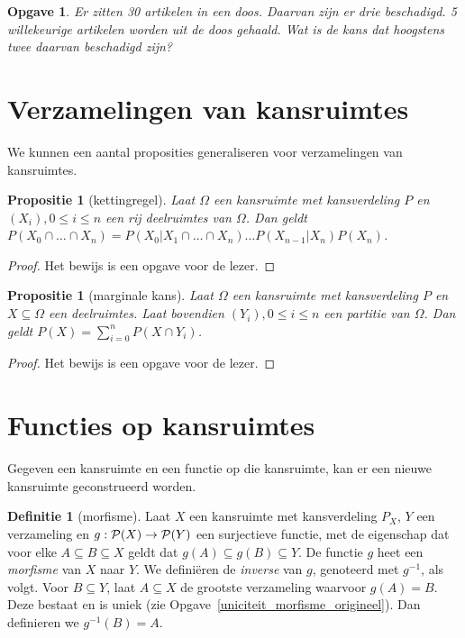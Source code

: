 \documentclass[a4paper]{book}
\newtheorem{proposition}[theorem]{Propositie}
\newtheorem{exercise}[theorem]{Opgave}
\theoremstyle{definition}
\newtheorem{definition}[theorem]{Definitie}
\begin{document}
\begin{exercise}
Er zitten 30 artikelen in een doos. Daarvan zijn er drie beschadigd.
5 willekeurige artikelen worden uit de doos gehaald. Wat is de kans dat hoogstens twee daarvan beschadigd zijn?
\end{exercise}


\section{Verzamelingen van kansruimtes}
We kunnen een aantal proposities generaliseren voor verzamelingen van kansruimtes.

\begin{proposition}[kettingregel]
    Laat $\Omega$ een kansruimte met kansverdeling $P$ en $(X_i), 0 \leq i \leq n$ een rij deelruimtes van $\Omega$.
    Dan geldt $P(X_0 \cap \dots \cap X_n) = P(X_0|X_1 \cap \dots \cap X_n) \dots P(X_{n-1}|X_n)P(X_n)$.
\end{proposition}
\begin{proof}
    Het bewijs is een opgave voor de lezer.
\end{proof}

\begin{proposition}[marginale kans]
    Laat $\Omega$ een kansruimte met kansverdeling $P$ en $X \subseteq \Omega$ een deelruimtes.
    Laat bovendien $(Y_i), 0 \leq i \leq n$ een partitie van $\Omega$.
    Dan geldt $P(X) = \sum_{i=0}^n P(X \cap Y_i)$.
\end{proposition}
\begin{proof}
    Het bewijs is een opgave voor de lezer.
\end{proof}


\section{Functies op kansruimtes}
Gegeven een kansruimte en een functie op die kansruimte, kan er een nieuwe kansruimte geconstrueerd worden.

\begin{definition}[morfisme]\label{morfisme}
    Laat $X$ een kansruimte met kansverdeling $P_X$, $Y$ een verzameling en $g: \powerset{X} \to \powerset{Y}$ een surjectieve functie,
    met de eigenschap dat voor elke $A \subseteq B \subseteq X$ geldt dat $g(A) \subseteq g(B) \subseteq Y$.
    De functie $g$ heet een \emph{morfisme} van $X$ naar $Y$.
    We defini\"eren de \emph{inverse} van $g$, genoteerd met $g^{-1}$, als volgt.
    Voor $B \subseteq Y$, laat $A \subseteq X$ de grootste verzameling waarvoor $g(A) = B$.
    Deze bestaat en is uniek (zie Opgave~\ref{uniciteit_morfisme_origineel}).
    Dan definieren we $g^{-1}(B) = A$.
\end{definition}
\end{document}
